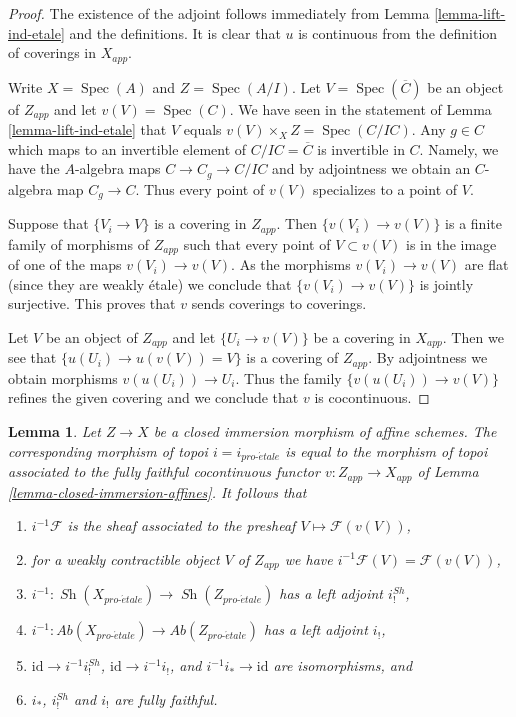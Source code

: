 \documentclass[10pt,a4paper]{article}
\theoremstyle{plain}
\newtheorem{lemma}[subsection]{Lemma}
\theoremstyle{definition}
\theoremstyle{remark}
\numberwithin{equation}{subsection}
\def\Spec{\mathop{\mathrm{Spec}}}
\def\Sh{\mathop{\mathit{Sh}}\nolimits}
\def\proetale{{pro\text{-}\acute{e}tale}}
\begin{document}
\begin{proof}
The existence of the adjoint follows immediately from
Lemma \ref{lemma-lift-ind-etale} and the definitions.
It is clear that $u$ is continuous from the definition of
coverings in $X_{app}$.

\medskip\noindent
Write $X = \Spec(A)$ and $Z = \Spec(A/I)$. Let $V = \Spec(\overline{C})$
be an object of $Z_{app}$ and let $v(V) = \Spec(C)$.
We have seen in the statement of Lemma \ref{lemma-lift-ind-etale}
that $V$ equals $v(V) \times_X Z = \Spec(C/IC)$.
Any $g \in C$ which maps to an invertible element of
$C/IC = \overline{C}$ is invertible in $C$. Namely, we have the
$A$-algebra maps $C \to C_g \to C/IC$ and by adjointness
we obtain an $C$-algebra map $C_g \to C$.
Thus every point of $v(V)$ specializes to a point of $V$.

\medskip\noindent
Suppose that $\{V_i \to V\}$ is a covering in $Z_{app}$.
Then $\{v(V_i) \to v(V)\}$ is a finite family of morphisms of
$Z_{app}$ such that every point of $V \subset v(V)$ is
in the image of one of the maps $v(V_i) \to v(V)$. As the
morphisms $v(V_i) \to v(V)$ are flat (since they are weakly \'etale)
we conclude that $\{v(V_i) \to v(V)\}$ is jointly surjective.
This proves that $v$ sends coverings to coverings.

\medskip\noindent
Let $V$ be an object of $Z_{app}$ and let $\{U_i \to v(V)\}$
be a covering in $X_{app}$. Then we see that
$\{u(U_i) \to u(v(V)) = V\}$ is a covering of $Z_{app}$.
By adjointness we obtain morphisms $v(u(U_i)) \to U_i$.
Thus the family $\{v(u(U_i)) \to v(V)\}$ refines the given
covering and we conclude that $v$ is cocontinuous.
\end{proof}

\begin{lemma}
\label{lemma-closed-immersion-affines-apply}
Let $Z \to X$ be a closed immersion morphism of affine schemes.
The corresponding morphism of topoi $i = i_\proetale$
is equal to the morphism of topoi
associated to the fully faithful cocontinuous functor
$v : Z_{app} \to X_{app}$ of Lemma \ref{lemma-closed-immersion-affines}.
It follows that
\begin{enumerate}
\item $i^{-1}\mathcal{F}$ is the sheaf associated to the presheaf
$V \mapsto \mathcal{F}(v(V))$,
\item for a weakly contractible object $V$ of $Z_{app}$ we have
$i^{-1}\mathcal{F}(V) = \mathcal{F}(v(V))$,
\item $i^{-1} : \Sh(X_\proetale) \to \Sh(Z_\proetale)$
has a left adjoint $i^{Sh}_!$,
\item $i^{-1} : \textit{Ab}(X_\proetale) \to \textit{Ab}(Z_\proetale)$
has a left adjoint $i_!$,
\item $\text{id} \to i^{-1}i^{Sh}_!$, $\text{id} \to i^{-1}i_!$, and
$i^{-1}i_* \to \text{id}$ are isomorphisms, and
\item $i_*$, $i^{Sh}_!$ and $i_!$ are fully faithful.
\end{enumerate}
\end{lemma}
\end{document}

